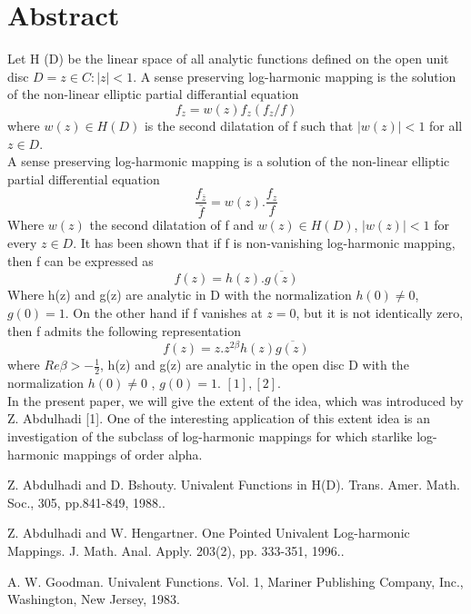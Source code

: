\documentclass[article,A4,11pt]{llncs}%
\begin{document}
\section*{Abstract}
 Let H (D) be the linear space of all analytic functions defined on the open unit  disc $D ={z \in C : |z| < 1}$. A sense preserving  log-harmonic mapping is the solution of the non-linear  elliptic  partial differantial equation 
$$f_{z}=w(z)f_{z}(f_{z}/f)$$ 
where $w(z)\in H (D)$  is the second dilatation of f  such that $|w(z)|<1$ for all $z\in D$.\\
A  sense preserving log-harmonic mapping  is a solution of the non-linear  elliptic partial differential equation
\begin{equation}
\frac{f_{\overline{z}}}{\overline{f}}=w(z).\frac{f_{z}}{f}
\end{equation}
Where $w(z)$ the second dilatation of  f and  $w(z)\in H(D)$, $|w(z)| <1$ for every $z\in D$. It  has  been shown that  if f is non-vanishing  log-harmonic mapping,  then  f can be expressed as
\begin{equation} f(z)=h(z).\overline{g(z)}
\end{equation}
Where h(z) and  g(z) are analytic  in D  with  the  normalization $h(0)\neq0$, $g(0) = 1$. On the other  hand  if f vanishes at $z=0$, but it is not identically zero, then f admits  the following representation
\begin{equation} f(z)=z.z^{2\beta}h(z)\overline{g(z)}
\end{equation}
where $Re \beta>-\frac{1}{2} $, h(z) and g(z) are analytic  in the open disc D with the normalization $h(0)\neq0$ ,
$g(0) = 1$. $[1], [2]$.\\

In the present paper, we will give the extent of the idea, which was introduced by Z. Abdulhadi [1]. One of the interesting application of this extent idea is an investigation of the subclass of log-harmonic mappings for which starlike log-harmonic mappings of order alpha.



\begin{thebibliography}{10}
{\sc  Z. Abdulhadi and D. Bshouty}. {Univalent Functions in H(D)}. Trans. Amer. Math. Soc., 305, pp.841-849, 1988..

{\sc Z. Abdulhadi and W. Hengartner}. {One Pointed Univalent Log-harmonic Mappings}.  J. Math. Anal. Apply. 203(2), pp. 333-351, 1996..

{\sc A. W. Goodman}. {Univalent Functions}. Vol. 1, Mariner Publishing Company, Inc., Washington, New Jersey, 1983.
\end{thebibliography}
\end{document}
